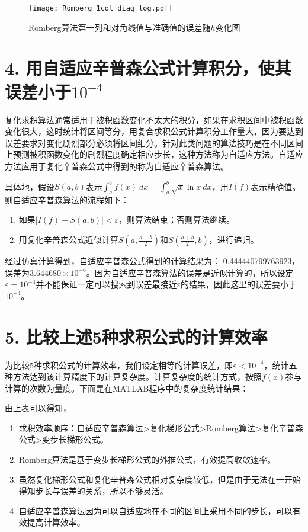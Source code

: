 \begin{figure}[t]
    \centering
    \texttt{[image: Romberg\_1col\_diag\_log.pdf]} \\
    \caption{Romberg算法第一列和对角线值与准确值的误差随$h$变化图}
    \label{fig:Romberg_T}
\end{figure}
\newpage
\section*{4. 用自适应辛普森公式计算积分，使其误差小于$10^{-4}$}

复化求积算法通常适用于被积函数变化不太大的积分，如果在求积区间中被积函数变化很大，这时统计将区间等分，用复合求积公式计算积分工作量大，因为要达到误差要求对变化剧烈部分必须将区间细分。针对此类问题的算法技巧是在不同区间上预测被积函数变化的剧烈程度确定相应步长，这种方法称为自适应方法。自适应方法应用于复化辛普森公式中得到的称为自适应辛普森算法。

具体地，假设$S(a,b)$表示$\int_{a}^{b} f(x) \ dx = \int_{a}^{b} \sqrt{x} \ln x  \ dx$，用$I(f)$表示精确值。则自适应辛普森算法的流程如下：
\begin{enumerate}
    \item 如果$|I(f) - S(a,b) | < \varepsilon$，则算法结束；否则算法继续。
    \item 用复化辛普森公式近似计算$S(a, \frac{a+b}{2})$和$S(\frac{a+b}{2}, b)$，进行递归。
\end{enumerate}

经过仿真计算得到，自适应辛普森公式得到的计算结果为：-0.444440799763923，误差为$3.644680\times 10^{-6}$。因为自适应辛普森算法的误差是近似计算的，所以设定$\varepsilon = 10^{-4}$并不能保证一定可以搜索到误差最接近$\varepsilon$的结果，因此这里的误差要小于$10^{-4}$。
\newpage
\section*{5. 比较上述5种求积公式的计算效率}

为比较5种求积公式的计算效率，我们设定相等的计算误差，即$\varepsilon < 10^{-4}$，统计五种方法达到该计算精度下的计算复杂度。计算复杂度的统计方式，按照$f(x)$参与计算的次数为量度。下面是在MATLAB程序中的复杂度统计结果：
\begin{table}[!hpt]
    \caption{5种求积公式计算复杂度统计表}
    \label{tab:Complexity}
    \centering
\end{table}

由上表可以得知，
\begin{enumerate}
    \item 求积效率顺序：自适应辛普森算法>复化梯形公式>Romberg算法>复化辛普森公式>变步长梯形公式。
    \item Romberg算法是基于变步长梯形公式的外推公式，有效提高收敛速率。
    \item 虽然复化梯形公式和复化辛普森公式相对复杂度较低，但是由于无法在一开始得知步长与误差的关系，所以不够灵活。
    \item 自适应辛普森算法因为可以自适应地在不同的区间上采用不同的步长，可以有效提高计算效率。
\end{enumerate}


